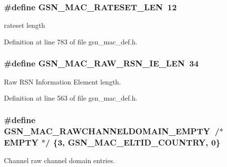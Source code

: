 \hypertarget{a00642_ga3c207cac645e3d78288b23f6291d759e}{
\subsubsection[{GSN\_\-MAC\_\-RATESET\_\-LEN}]{\setlength{\rightskip}{0pt plus 5cm}\#define GSN\_\-MAC\_\-RATESET\_\-LEN~12}}
\label{a00642_ga3c207cac645e3d78288b23f6291d759e}


rateset length 



Definition at line 783 of file gsn\_\-mac\_\-def.h.

\hypertarget{a00642_gade0df88c41a2fec188655329c10a73ed}{
\subsubsection[{GSN\_\-MAC\_\-RAW\_\-RSN\_\-IE\_\-LEN}]{\setlength{\rightskip}{0pt plus 5cm}\#define GSN\_\-MAC\_\-RAW\_\-RSN\_\-IE\_\-LEN~34}}
\label{a00642_gade0df88c41a2fec188655329c10a73ed}


Raw RSN Information Element length. 



Definition at line 563 of file gsn\_\-mac\_\-def.h.

\hypertarget{a00642_ga56ae91b81107b9438ab55637317cab2c}{
\subsubsection[{GSN\_\-MAC\_\-RAWCHANNELDOMAIN\_\-EMPTY}]{\setlength{\rightskip}{0pt plus 5cm}\#define GSN\_\-MAC\_\-RAWCHANNELDOMAIN\_\-EMPTY~/$\ast$ EMPTY  $\ast$/ \{3, GSN\_\-MAC\_\-ELTID\_\-COUNTRY, 0\}}}
\label{a00642_ga56ae91b81107b9438ab55637317cab2c}


Channel raw channel domain entries. 



